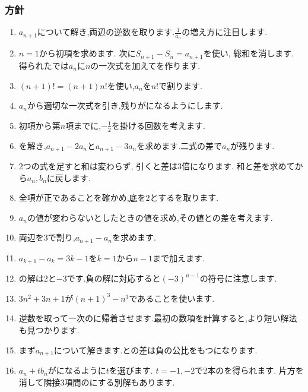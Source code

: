 \subsubsection{方針}\label{節：標準：方針}
\begin{enumerate}[label=\textbf{問\arabic*.},leftmargin=3.8em,format=\bookitemlink{practice-basic}{hint}{answer}]
  \item $a_{n+1}$について解き,両辺の逆数を取ります.$\frac{1}{a_n}$の増え方に注目します.
  \item $n=1$から初項を求めます. 次に$S_{n+1}-S_n=a_{n+1}$を使い, 総和を消します. 得られたでは$a_n$に$n$の一次式を加えてを作ります.
  \item $(n+1)!=(n+1)n!$を使い,$a_n$を$n!$で割ります.
  \item $a_n$から適切な一次式を引き,残りがになるようにします.
  \item 初項から第$n$項までに,$-\frac12$を掛ける回数を考えます.
  \item {}を解き,$a_{n+1}-2a_n$と$a_{n+1}-3a_n$を求めます.二式の差で$a_n$が残ります.
  \item 2つの式を足すと和は変わらず, 引くと差は3倍になります. 和と差を求めてから$a_n,b_n$に戻します.
  \item 全項が正であることを確かめ,底を$2$とするを取ります.
  \item $a_n$の値が変わらないとしたときの値を求め,その値との差を考えます.
  \item 両辺を$3$で割り,$a_{n+1}-a_n$を求めます.
  \item $a_{k+1}-a_k=3k-1$を$k=1$から$n-1$まで加えます.
  \item {}の解は$2$と$-3$です.負の解に対応すると$(-3)^{n-1}$の符号に注意します.
  \item $3n^2+3n+1$が$(n+1)^3-n^3$であることを使います.
  \item 逆数を取って一次のに帰着させます.最初の数項を計算すると,より短い解法も見つかります.
  \item まず$a_{n+1}$について解きます.との差は負の公比をもつになります.
  \item $a_n+t b_n$がになるように$t$を選びます. $t=-1,-2$で2本のを得られます. 片方を消して隣接3項間のにする別解もあります.

\end{enumerate}
